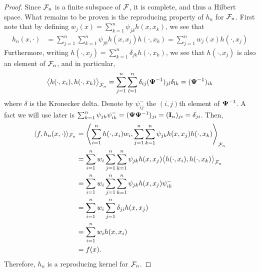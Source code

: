 \begin{proof}
  Since ${\mathcal F}_n$ is a finite subspace of ${\mathcal F}$, it is complete, and thus a Hilbert space.
  What remains to be proven is the reproducing property of $h_n$ for ${\mathcal F}_n$.
  First note that by defining $w_j(x) = \sum_{k=1}^n \psi_{jk} h(x,x_k)$, we see that
  \begin{align*}
    h_n(x,\cdot) 
    &= \sum_{j=1}^n\sum_{k=1}^n \psi_{jk} h(x,x_j) h(\cdot,x_k) 
    = \sum_{j=1}^n w_j(x)h(\cdot,x_j)
  \end{align*}
  Furthermore, writing $h(\cdot,x_j) = \sum_{k=1}^n \delta_{jk} h(\cdot,x_k)$, we see that $h(\cdot,x_j)$ is also an element of ${\mathcal F}_n$, and in particular,
  \[
    \big\langle h(\cdot,x_i), h(\cdot,x_k) \big\rangle_{{\mathcal F}_n} 
    = \sum_{j=1}^n\sum_{l=1}^n \delta_{ij} ({\bm\Psi}^{-1})_{jl} \delta_{lk} = ({\bm\Psi}^{-1})_{ik}
  \]
  where $\delta$ is the Kronecker delta. 
  Denote by $\psi_{ij}^{-}$ the $(i,j)$th element of ${\bm\Psi}^{-1}$.
  A fact we will use later is $\sum_{k=1}^n \psi_{jk}\psi_{ik}^{-} = ({\bm\Psi}{\bm\Psi}^{-1})_{ji} = ({\mathbf I}_n)_{ji} = \delta_{ji}$.  
  Then,
  \begin{align*}
    \langle f, h_n(x,\cdot)\rangle_{{\mathcal F}_n}
    &= \left\langle 
    \sum_{i=1}^n h(\cdot,x_i)w_i ,
    \sum_{j=1}^n\sum_{k=1}^n \psi_{jk} h(x,x_j) h(\cdot,x_k)
    \right\rangle_{{\mathcal F}_n} \\
    &= \sum_{i=1}^n w_i \sum_{j=1}^n\sum_{k=1}^n \psi_{jk} h(x,x_j) 
    \big\langle h(\cdot,x_i) , h(\cdot,x_k) \big\rangle_{{\mathcal F}_n} \\
    &= \sum_{i=1}^n w_i \sum_{j=1}^n\sum_{k=1}^n \psi_{jk}h(x,x_j)\psi_{ik}^{-} \\
    &= \sum_{i=1}^n w_i \sum_{j=1}^n \delta_{ji}h(x,x_j) \\
    &= \sum_{i=1}^n w_i h(x,x_i) \\
    &= f(x).
  \end{align*}
  Therefore, $h_n$ is a reproducing kernel for ${\mathcal F}_n$.
\end{proof}


